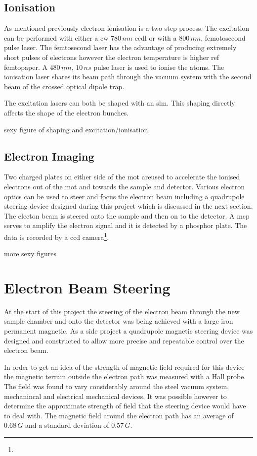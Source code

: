 \subsection{Ionisation}

As mentioned previously electron ionisation is a two step process. The excitation can be performed with either a \gls{cw} $780\,\unit{nm}$ \gls{ecdl} or with a $800\,\unit{nm}$, femotosecond pulse laser. The femtosecond laser has the advantage of producing extremely short pulses of electrons however the electron temperature is higher{\color{red} ref femtopaper}. A $480\,\unit{nm}$, $10\,\unit{ns}$ pulse laser is used to ionise the atoms. The ionisation laser shares its beam path through the vacuum system with the second beam of the crossed optical dipole trap.

The excitation lasers can both be shaped with an \gls{slm}\cite{mcculoch_arbitrarily_2012}. This shaping directly affects the shape of the electron bunches.

{\color{red} sexy figure of shaping and excitation/ionisation}


\subsection{Electron Imaging}

Two charged plates on either side of the \gls{mot} areused to accelerate the ionised electrons out of the \gls{mot} and towards the sample and detector. Various electron optics can be used to steer and focus the electron beam including a quadrupole steering device designed during this project which is discussed in the next section. The electon beam is steered onto the sample and then on to the detector. A \gls{mcp} serves to amplify the electron signal and it is detected by a phosphor plate. The data is recorded by a \gls{ccd} camera\footnote{}.

{\color{red} more sexy figures}

\section{Electron Beam Steering}
At the start of this project the steering of the electron beam through the new sample chamber and onto the detector was being achieved with a large iron permanent magnetic. As a side project a quadrupole magnetic steering device was designed and constructed to allow more precise and repeatable control over the electron beam.

In order to get an idea of the strength of magnetic field required for this device the magnetic terrain outside the electron path was measured with a Hall probe. The field was found to vary considerably around the steel vacuum system, mechanincal and electrical mechanical devices. It was possible however to determine the approximate strength of field that the steering device would have to deal with. The magnetic field around the electron path has an average of $0.68\,\unit{G}$ and a standard deviation of $0.57\,\unit{G}$.

